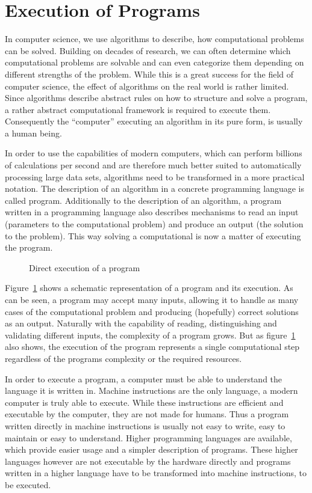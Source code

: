 
\section{Execution of Programs}\label{chap:programs}

In computer science, we use algorithms to describe, how computational problems can be solved.
Building on decades of research, we can often determine which computational problems are solvable and can even categorize them depending on different strengths of the problem\citationneeded[].
While this is a great success for the field of computer science, the effect of algorithms on the real world is rather limited.
Since algorithms describe abstract rules on how to structure and solve a program, a rather abstract computational framework is required to execute them.
Consequently the \enquote{computer} executing an algorithm in its pure form, is usually a human being.

In order to use the capabilities of modern computers, which can perform billions of calculations per second and are therefore much better suited to automatically processing large data sets, algorithms need to be transformed in a more practical notation.
The description of an algorithm in a concrete programming language is called program.
Additionally to the description of an algorithm, a program written in a programming language also describes mechanisms to read an input (parameters to the computational problem) and produce an output (the solution to the problem).
This way solving a computational is now a matter of executing the program.

\begin{figure}
  \centering
  
  \caption{Direct execution of a program}\label{fig:native-program}
\end{figure}

Figure~\ref{fig:native-program} shows a schematic representation of a program and its execution. %
As can be seen, a program may accept many inputs, allowing it to handle as many cases of the computational problem and producing (hopefully) correct solutions as an output.
Naturally with the capability of reading, distinguishing and validating different inputs, the complexity of a program grows.
But as figure~\ref{fig:native-program} also shows, the execution of the program represents a single computational step regardless of the programs complexity or the required resources.

In order to execute a program, a computer must be able to understand the language it is written in.
Machine instructions are the only language, a modern computer is truly able to execute.
While these instructions are efficient and executable by the computer, they are not made for humans.
Thus a program written directly in machine instructions is usually not easy to write, easy to maintain or easy to understand.
Higher programming languages are available, which provide easier usage and a simpler description of programs.
These higher languages however are not executable by the hardware directly and programs written in a higher language have to be transformed into machine instructions, to be executed.

